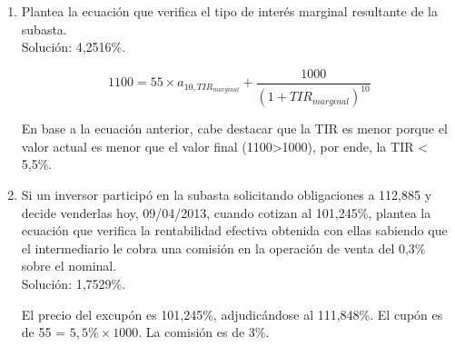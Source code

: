 \begin{enumerate}[label=\textbf{\alph*)}]
    \item Plantea la ecuación que verifica el tipo de interés marginal resultante de la subasta.\\
    Solución: 4,2516\%.

    \begin{equation*}
        1100 = 55 \times a_{10,TIR_{marginal}} + \frac{1000}{(1+TIR_{marginal})^{10}}
    \end{equation*}

    En base a la ecuación anterior, cabe destacar que la TIR es menor porque el valor actual es menor que el valor final (1100>1000), por ende, la TIR < 5,5\%.



    \item Si un inversor participó en la subasta solicitando obligaciones a 112,885 y decide venderlas hoy, 09/04/2013, cuando cotizan al 101,245\%, plantea la ecuación que verifica la rentabilidad efectiva obtenida con ellas sabiendo que el intermediario le cobra una comisión en la operación de venta del 0,3\% sobre el nominal.\\
    Solución: 1,7529\%.

    El precio del excupón es 101,245\%, adjudicándose al 111,848\%.
    El cupón es de 55 = $5,5\% \times 1000$.
    La comisión es de 3\%.
    \\\\\\\\
\end{enumerate}
